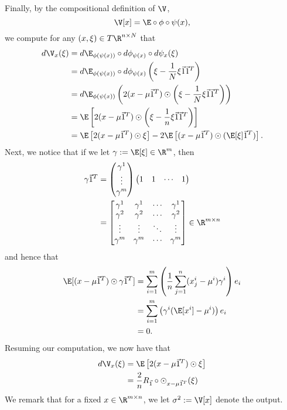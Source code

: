 \begin{enumerate}
	  Finally, by the compositional definition of $\V$,
	  $$\V[x]=\E\circ\phi\circ\psi(x),$$
	  we compute for any $(x,\xi)\in T\R^{n\times N}$ that
	  \begin{align*}
	  	d\V_x(\xi)&=d\E_{\phi(\psi(x))}\circ d\phi_{\psi(x)}\circ d\psi_x(\xi)\\
	  	&=d\E_{\phi(\psi(x))}\circ d\phi_{\psi(x)}\left(\xi-\frac{1}{N}\xi\vec{1}\vec{1}^T\right)\\
	  	&=d\E_{\phi(\psi(x))}\left(2(x-\mu\vec{1}^T)\odot\left(\xi-\frac{1}{N}\xi\vec{1}\vec{1}^T\right)\right)\\
	  	&=\E\left[2(x-\mu\vec{1}^T)\odot\left(\xi-\frac{1}{n}\xi\vec{1}\vec{1}^T\right)\right]\\
	  	&=\E\left[2(x-\mu\vec{1}^T)\odot\xi\right]-2\E\left[(x-\mu\vec{1}^T)\odot(\E[\xi]\vec{1}^T)\right].
	  \end{align*}
	  Next, we notice that if we let $\gamma:=\E[\xi]\in\R^m$, then
	  \begin{align*}
	  	\gamma\vec{1}^T&=\begin{pmatrix}
	  		\gamma^1\\
	  		\vdots\\
	  		\gamma^m
	  	\end{pmatrix}\begin{pmatrix}
	  		1&1&\cdots&1
	  	\end{pmatrix}\\
	  	&=\begin{bmatrix}
	  		\gamma^1&\gamma^1&\cdots&\gamma^1\\
	  		\gamma^2&\gamma^2&\cdots&\gamma^2\\
	  		\vdots&\vdots&\ddots&\vdots\\
	  		\gamma^m&\gamma^m&\cdots&\gamma^m
	  	\end{bmatrix}\in\R^{m\times n}
	  \end{align*}
	  and hence that
	  \begin{align*}
	  	\E[(x-\mu\vec{1}^T)\odot\gamma\vec{1}^T]&=\sum_{i=1}^m\left(\frac{1}{n}\sum_{j=1}^n(x^i_j-\mu^i)\gamma^i\right)e_i\\
	  	&=\sum_{i=1}^m\left(\gamma^i(\E[x^i]-\mu^i)\right)e_i\\
	  	&=0.
	  \end{align*}
	  Resuming our computation, we now have that
	  \begin{align*}
	  	d\V_x(\xi)&=\E\left[2(x-\mu\vec{1}^T)\odot\xi\right]\\
	  	&=\frac{2}{n}R_{\vec{1}}\circ\odot_{x-\mu\vec{1}^T}(\xi)
	  \end{align*}
	  We remark that for a fixed $x\in\R^{m\times n}$, we let $\sigma^2:=\V[x]$ denote the output.
\end{enumerate}

